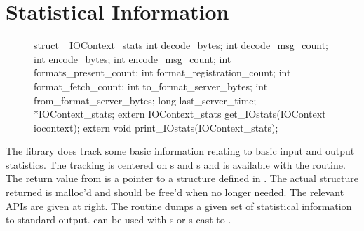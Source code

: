 \section{Statistical Information}
\begin{figure}
\vspace*{-.5in}
\begin{WrapCode}
struct _IOContext_stats {
    int decode_bytes;
    int decode_msg_count;
    int encode_bytes;
    int encode_msg_count;
    int formats_present_count;
    int format_registration_count;
    int format_fetch_count;
    int to_format_server_bytes;
    int from_format_server_bytes;
    long last_server_time;
} *IOContext_stats;
extern IOContext_stats get_IOstats(IOContext iocontext);
extern void print_IOstats(IOContext_stats);
\end{WrapCode}
\end{figure}
The library does track some basic information relating to basic input and
output statistics.  The tracking is centered on s and
s and is available with the 
routine.  The return value from  is a pointer to a
structure defined in .  The actual structure returned is
malloc'd and should be free'd when no longer needed.  The relevant APIs are
given at right.  The routine  dumps a given set of
statistical information to standard output.   can be
used with s or s cast to
. 

